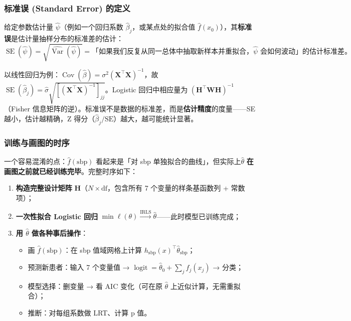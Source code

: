 \subsubsection{标准误 (Standard Error) 的定义}

给定参数估计量 $\hat{\psi}$（例如一个回归系数 $\hat{\beta}_j$，或某点处的拟合值 $\hat{f}(x_0)$），其\textbf{标准误}是估计量抽样分布的标准差的估计：
\[
\boxed{\operatorname{SE}(\hat{\psi}) = \sqrt{\widehat{\operatorname{Var}}(\hat{\psi})}
    = \text{「如果我们反复从同一总体中抽取新样本并重拟合，}\hat{\psi}\text{ 会如何波动」的估计标准差。}}
\]

以线性回归为例：$\operatorname{Cov}(\hat{\beta}) = \sigma^2(\mathbf{X}^\top\mathbf{X})^{-1}$，故 $\operatorname{SE}(\hat{\beta}_j) = \hat{\sigma}\sqrt{[(\mathbf{X}^\top\mathbf{X})^{-1}]_{jj}}$。Logistic 回归中相应量为 $(\mathbf{H}^\top\mathbf{W}\mathbf{H})^{-1}$（Fisher 信息矩阵的逆）。标准误不是数据的标准差，而是\textbf{估计精度}的度量——SE 越小，估计越精确，Z 得分（$\hat{\beta}_j/\mathrm{SE}$）越大，越可能统计显著。

\subsubsection{训练与画图的时序}

一个容易混淆的点：$\hat{f}(\text{sbp})$ 看起来是「对 sbp 单独拟合的曲线」，但实际上$\hat{\theta}$ \textbf{在画图之前就已经训练完毕}。完整时序如下：

\begin{enumerate}[label=(\arabic*)]
    \item \textbf{构造完整设计矩阵} $\mathbf{H}$（$N\times\mathrm{df}$，包含所有 7 个变量的样条基函数列 + 常数项）；
    \item \textbf{一次性拟合 Logistic 回归} $\min\ell(\theta) \xrightarrow{\mathrm{IRLS}} \hat{\theta}$——此时模型已训练完成；
    \item \textbf{用 $\hat{\theta}$ 做各种事后操作}：
    \begin{itemize}
        \item 画 $\hat{f}(\text{sbp})$：在 sbp 值域网格上计算 $h_{\mathrm{sbp}}(x)^\top\hat{\theta}_{\mathrm{sbp}}$；
        \item 预测新患者：输入 7 个变量值 → $\operatorname{logit} = \hat{\theta}_0 + \sum_j \hat{f}_j(x_j)$ → 分类；
        \item 模型选择：删变量 → 看 AIC 变化（可在原 $\hat{\theta}$ 上近似计算，无需重拟合）；
        \item 推断：对每组系数做 LRT、计算 p 值。
    \end{itemize}
\end{enumerate}

